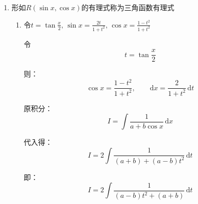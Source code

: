 \documentclass[../book.tex]{subfiles}
\begin{document}
\begin{enumerate}
\begin{circlenum}
\begin{analysisbox}[Example]
                      解恒等式：
                      \[
                          A(2x-1)^2
                          +
                          B(x+1)(2x-1)
                          +
                          C(x+1)
                          =
                          4x^2 - 6x - 1
                      \]

                      在恒等式中，对变量 $x$ 取任意值，等式两边应恒相等，
                      因此可代入特殊值求系数。

                      令
                      \[
                          x = -1,
                          \quad
                          x = \frac{1}{2},
                          \quad
                          x = 0
                      \]
                      即可求得 $A, B, C$
            \end{analysisbox}
        \end{circlenum}
        \item 形如$R(\sin x, \cos x)$的有理式称为三角函数有理式
        \begin{enumerate}
            \item 令$t = \tan \displaystyle\frac{x}{2},\, \sin x = \displaystyle\frac{2t}{1 + t^2},\, \cos x = \displaystyle\frac{1-t^2}{1+t^2}$
            \begin{analysisbox}
                令
                \[
                    t=\tan\frac{x}{2}
                \]

                则：
                \[
                    \cos x=\frac{1-t^2}{1+t^2},
                    \qquad
                    \mathrm{d}x=\frac{2}{1+t^2}\,\mathrm{d}t
                \]

                原积分：
                \[
                    I=\int\frac{1}{a+b\cos x}\,\mathrm{d}x
                \]

                代入得：
                \[
                    I
                    =
                    2\int
                    \frac{
                        1
                    }{
                        (a+b)+(a-b)t^2
                    }
                    \,\mathrm{d}t
                \]

                即：
                \[
                    I
                    =
                    2\int
                    \frac{
                        1
                    }{
                        (a-b)t^2+(a+b)
                    }
                    \,\mathrm{d}t
                \]

                \vspace{1em}


\end{analysisbox}
\end{enumerate}
\end{enumerate}
\end{document}
